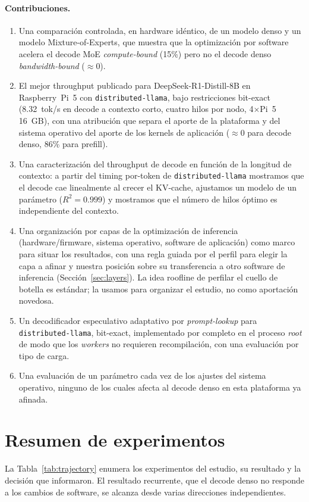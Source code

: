 \documentclass[10pt,a4paper]{article}
\begin{document}
\paragraph{Contribuciones.}
\begin{enumerate}
  \item Una comparación controlada, en hardware idéntico, de un modelo denso y un modelo Mixture-of-Experts, que muestra que la optimización por software acelera el decode MoE \emph{compute-bound} (15\%) pero no el decode denso \emph{bandwidth-bound} ($\approx$0).
  \item El mejor throughput publicado para DeepSeek-R1-Distill-8B en Raspberry~Pi~5 con \texttt{distributed-llama}, bajo restricciones bit-exact (8.32~tok/s en decode a contexto corto, cuatro hilos por nodo, 4$\times$Pi~5 16~GB), con una atribución que separa el aporte de la plataforma y del sistema operativo del aporte de los kernels de aplicación ($\approx$0 para decode denso, 86\% para prefill).
  \item Una caracterización del throughput de decode en función de la longitud de contexto: a partir del timing por-token de \texttt{distributed-llama} mostramos que el decode cae linealmente al crecer el KV-cache, ajustamos un modelo de un parámetro ($R^2{=}0.999$) y mostramos que el número de hilos óptimo es independiente del contexto.
  \item Una organización por capas de la optimización de inferencia (hardware/firmware, sistema operativo, software de aplicación) como marco para situar los resultados, con una regla guiada por el perfil para elegir la capa a afinar y nuestra posición sobre su transferencia a otro software de inferencia (Sección~\ref{sec:layers}). La idea roofline de perfilar el cuello de botella es estándar; la usamos para organizar el estudio, no como aportación novedosa.
  \item Un decodificador especulativo adaptativo por \emph{prompt-lookup} para \texttt{distributed-llama}, bit-exact, implementado por completo en el proceso \emph{root} de modo que los \emph{workers} no requieren recompilación, con una evaluación por tipo de carga.
  \item Una evaluación de un parámetro cada vez de los ajustes del sistema operativo, ninguno de los cuales afecta al decode denso en esta plataforma ya afinada.
\end{enumerate}

\section{Resumen de experimentos}
\label{sec:trajectory}
La Tabla~\ref{tab:trajectory} enumera los experimentos del estudio, su resultado y la decisión que informaron. El resultado recurrente, que el decode denso no responde a los cambios de software, se alcanza desde varias direcciones independientes.
\end{document}
